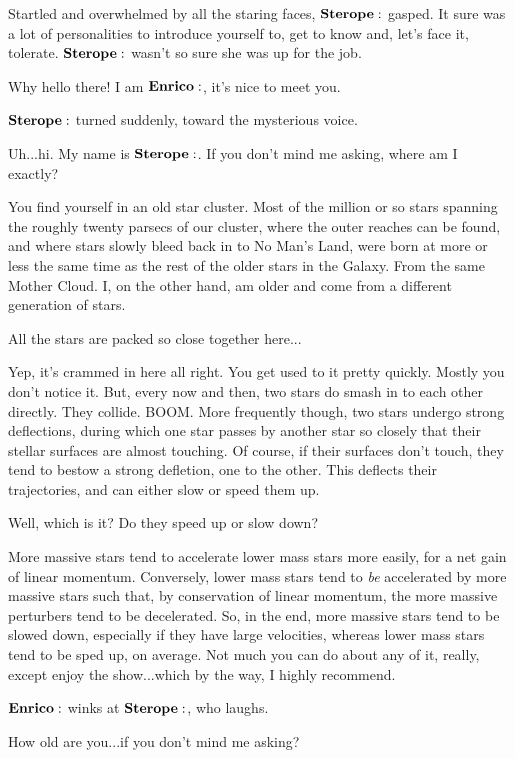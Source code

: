 \documentclass[main.tex]{subfiles}
\begin{document}
Startled and overwhelmed by all the staring faces, $\Sterope$ gasped.  It sure was a lot of personalities to introduce yourself to, get to know and, let's face it, tolerate.  $\Sterope$ wasn't so sure she was up for the job.

\Enrico Why hello there!  I am $\Enrico$, it's nice to meet you.

$\Sterope$ turned suddenly, toward the mysterious voice.

\Sterope Uh...hi.  My name is $\Sterope$.  If you don't mind me asking, where am I exactly?

\Enrico You find yourself in an old star cluster.  Most of the million or so stars spanning the roughly twenty parsecs of our cluster, where the outer reaches can be found, and where stars slowly bleed back in to No Man's Land, were born at more or less the same time as the rest of the older stars in the Galaxy.  From the same Mother Cloud.  I, on the other hand, am older and come from a different generation of stars.  

\Sterope All the stars are packed so close together here...

\Enrico Yep, it's crammed in here all right.  You get used to it pretty quickly.  Mostly you don't notice it.  But, every now and then, two stars do smash in to each other directly.  They collide.  BOOM.  More frequently though, two stars undergo strong deflections, during which one star passes by another star so closely that their stellar surfaces are almost touching.  Of course, if their surfaces don't touch, they tend to bestow a strong defletion, one to the other.  This deflects their trajectories, and can either slow or speed them up.  

\Sterope Well, which is it?  Do they speed up or slow down?

\Enrico More massive stars tend to accelerate lower mass stars more easily, for a net gain of linear momentum. Conversely, lower mass stars tend to \textit{be} accelerated by more massive stars such that, by conservation of linear momentum, the more massive perturbers tend to be decelerated. So, in the end, more massive stars tend to be slowed down, especially if they have large velocities, whereas lower mass stars tend to be sped up, on average.  Not much you can do about any of it, really, except enjoy the show...which by the way, I highly recommend.

$\Enrico$ winks at $\Sterope$, who laughs.

\Sterope How old are you...if you don't mind me asking?
\end{document}
